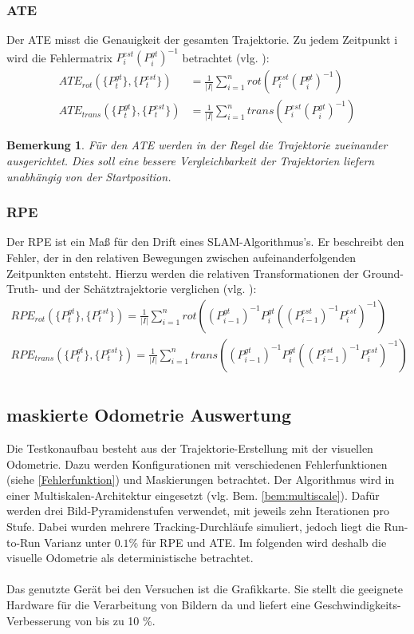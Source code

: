 \documentclass[12pt,DIV=15,BCOR=15mm,twoside,headsepline,abstract=true,listof=totoc,bibliography=totoc]{scrreprt}
\newtheorem{remark}{Bemerkung}[chapter]
\theoremstyle{remark}    %
\begin{document}
    \subsubsection{ATE}
    Der \ac{ATE} misst die Genauigkeit der gesamten Trajektorie. Zu jedem Zeitpunkt i wird die Fehlermatrix $P_i^{est}(P_i^{gt})^{-1}$ betrachtet (vlg. \cite{sturm12iros}): 
    \begin{align*}
        ATE_{rot}(\{P^{gt}_t\}, \{P^{est}_t\}) &= \frac{1}{|I|}\sum_{i = 1}^{n} rot(P_i^{est}(P_i^{gt})^{-1})\\
        ATE_{trans}(\{P^{gt}_t\}, \{P^{est}_t\}) &= \frac{1}{|I|}\sum_{i = 1}^{n} trans(P_i^{est}(P_i^{gt})^{-1})
    \end{align*}
    \begin{remark}
        Für den \ac{ATE} werden in der Regel die Trajektorie zueinander ausgerichtet. Dies soll eine bessere Vergleichbarkeit der Trajektorien liefern
        unabhängig von der Startposition.
    \end{remark}

    \subsubsection{RPE}
    Der \ac{RPE} ist ein Maß für den Drift eines \ac{SLAM}-Algorithmus's. Er beschreibt den Fehler, der in den relativen Bewegungen zwischen aufeinanderfolgenden 
    Zeitpunkten entsteht. Hierzu werden die relativen Transformationen der Ground-Truth- und der Schätztrajektorie verglichen (vlg. \cite{sturm12iros}):
    \begin{align*}
        RPE_{rot}(\{P^{gt}_t\}, \{P^{est}_t\}) = \frac{1}{|I|} \sum_{i = 1}^{n} rot ((P_{i-1}^{gt})^{-1}P_{i}^{gt}\left((P^{est}_{i-1})^{-1}P^{est}_i\right)^{-1})\\
        RPE_{trans}(\{P^{gt}_t\}, \{P^{est}_t\}) = \frac{1}{|I|} \sum_{i = 1}^{n}  trans((P_{i-1}^{gt})^{-1}P_{i}^{gt}\left((P^{est}_{i-1})^{-1}P^{est}_i\right)^{-1})\\
    \end{align*}

    \subsection{maskierte Odometrie Auswertung} \label{sec:aus_vis_odom}
    Die Testkonaufbau besteht aus der Trajektorie-Erstellung mit der visuellen Odometrie. Dazu werden Konfigurationen mit verschiedenen Fehlerfunktionen 
    (siehe \ref{Fehlerfunktion}) und Maskierungen betrachtet.
    Der Algorithmus wird in einer Multiskalen-Architektur eingesetzt (vlg. Bem. \ref{bem:multiscale}). Dafür werden drei Bild-Pyramidenstufen verwendet, 
    mit jeweils zehn Iterationen pro Stufe. Dabei wurden mehrere Tracking-Durchläufe simuliert, jedoch liegt die Run-to-Run Varianz unter $0.1 \%$ 
    für \ac{RPE} und \ac{ATE}. Im folgenden wird deshalb die visuelle Odometrie als deterministische betrachtet.\\\\
    Das genutzte Gerät bei den Versuchen ist die Grafikkarte. Sie stellt die geeignete Hardware für die Verarbeitung von Bildern da und liefert 
    eine Geschwindigkeits-Verbesserung von bis zu 10 \%.
\end{document}
